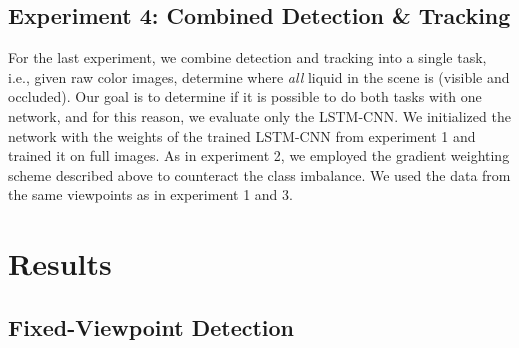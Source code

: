 \documentclass[runningheads,a4paper]{llncs}
\begin{document}
\vspace{-0.3cm}
\subsection{Experiment 4: Combined Detection \& Tracking}
\vspace{-0.3cm}

For the last experiment, we combine detection and tracking into a single task, i.e., given raw color images, determine where {\it all} liquid in the scene is (visible and occluded). 
Our goal is to determine if it is possible to do both tasks with one network, and for this reason, we evaluate only the LSTM-CNN.
We initialized the network with the weights of the trained LSTM-CNN from experiment 1 and trained it on full images. 
As in experiment 2, we employed the gradient weighting scheme described above to counteract the class imbalance. 
We used the data from the same viewpoints as in experiment 1 and 3.

\vspace{-0.6cm}
\section{Results}
\label{sec:results}
\vspace{-0.3cm}
\subsection{Fixed-Viewpoint Detection}
\label{sec:results1}
\vspace{-0.2cm}
\end{document}
